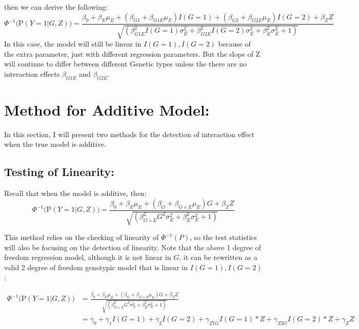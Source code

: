 \documentclass[
]{article}
\begin{document}
then we can derive the following:
\[\Phi^{-1} \bigg(\text{P}(Y = 1 | G, Z) \bigg) = \frac{\beta_0+\beta_E \mu_E+(\beta_{G1} + \beta_{G1E} \mu_E)I(G = 1)+(\beta_{G2} + \beta_{G2E} \mu_E)I(G = 2) + \beta_Z Z}{\sqrt{(\beta_{G1E}^2 I(G = 1) \sigma_E^2 +\beta_{G2E}^2 I(G = 2) \sigma_E^2 + \beta_E^2 \sigma_E^2 + 1)}} \]
In this case, the model will still be linear in \(I(G = 1), I(G = 2)\)
because of the extra parameter, just with different regression
parameters. But the slope of Z will continue to differ between different
Genetic types unless the there are no interaction effects
\(\beta_{G1E}\) and \(\beta_{G2E}\).

\clearpage

\hypertarget{method-for-additive-model}{%
\section{Method for Additive Model:}\label{method-for-additive-model}}

In this section, I will present two methods for the detection of
interaction effect when the true model is additive.

\hypertarget{testing-of-linearity}{%
\subsection{Testing of Linearity:}\label{testing-of-linearity}}

Recall that when the model is additive, then:
\[\Phi^{-1} \bigg(\text{P}(Y = 1 | G, Z) \bigg) = \frac{\beta_0+\beta_E \mu_E+(\beta_G + \beta_{G\times E} \mu_E)G + \beta_Z Z}{\sqrt{(\beta_{G\times E}^2 G^2 \sigma_E^2 + \beta_E^2 \sigma_E^2 + 1)}}\]

This method relies on the checking of linearity of \(\Phi^{-1}(P)\), so
the test statistics will also be focusing on the detection of linearity.
Note that the above 1 degree of freedom regression model, although it is
not linear in \(G\), it can be rewritten as a valid 2 degree of freedom
genotypic model that is linear in \(I(G=1), I(G=2)\):

\begin{equation}
\begin{aligned}
\Phi^{-1} \bigg(\text{P}(Y = 1 | G, Z) \bigg) &= \frac{\beta_0+\beta_E \mu_E+(\beta_G + \beta_{G\times E} \mu_E)G + \beta_Z Z}{\sqrt{(\beta_{G\times E}^2 G^2 \sigma_E^2 + \beta_E^2 \sigma_E^2 + 1)}} \\
                                              &= \gamma_0 + \gamma_1 I(G = 1) + \gamma_2 I(G=2) + \gamma_{Z1G} I(G=1) * Z + \gamma_{Z2G} I(G=2) * Z + \gamma_Z Z 
\end{aligned}
\end{equation}
\end{document}
